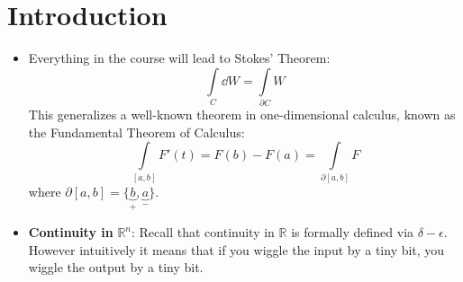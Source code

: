 \section{Introduction}
\begin{itemize}
    \item Everything in the course will lead to Stokes' Theorem:
    \begin{equation}
        \int\limits_C \dd{W} = \int\limits_{\partial C}W
    \end{equation}
    This generalizes a well-known theorem in one-dimensional calculus, known as the Fundamental Theorem of Calculus:
    \begin{equation}
        \int\limits_{[a,b]} F'(t) = F(b) - F(a) = \int\limits_{\partial[a,b]}F
    \end{equation}
    where $\partial[a,b] = \{\underbrace{b}_{+},\underbrace{a}_{-}\}$.
    \item \textbf{Continuity in} $\mathbb{R}^n$: Recall that continuity in $\mathbb{R}$ is formally defined via $\delta-\epsilon.$ However intuitively it means that if you wiggle the input by a tiny bit, you wiggle the output by a tiny bit.
    

\end{itemize}
